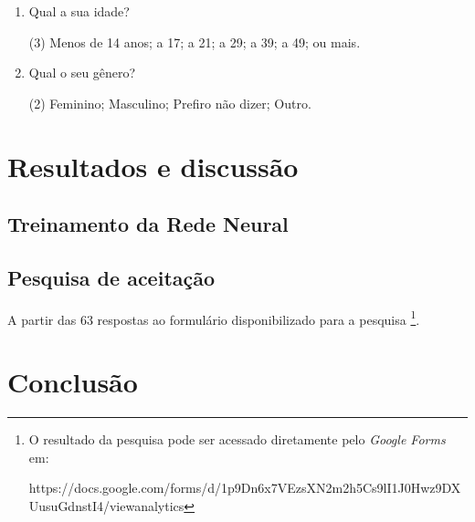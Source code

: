 \documentclass[12pt, a4paper]{article}
\begin{document}
\begin{enumerate}
\item Qual a sua idade?
\begin{tasks}(3)
	\task Menos de 14 anos;
	 a 17;
	 a 21;
	 a 29;
	 a 39;
	 a 49;
	 ou mais.
\end{tasks}

\item Qual o seu gênero?
\begin{tasks}(2)
	\task Feminino;
	\task Masculino;
	\task Prefiro não dizer;
	\task Outro.
\end{tasks}
\end{enumerate}

\section{Resultados e discussão}
\subsection{Treinamento da Rede Neural}

\subsection{Pesquisa de aceitação}
A partir das 63 respostas ao formulário disponibilizado para a pesquisa
\footnote{
	O resultado da pesquisa pode ser acessado diretamente pelo \emph{Google Forms} em:

	https://docs.google.com/forms/d/1p9Dn6x7VEzsXN2m2h5Cs9lI1J0Hwz9DXUusuGdnstI4/viewanalytics
}.

\section{Conclusão}

\newpage
\printbibliography
\end{document}
